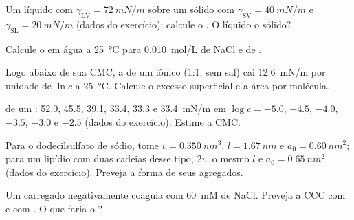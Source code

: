 \begin{exercise}[$\star$]\label{exo:b3:colloids:3}
Um líquido com $\gamma_{\mathrm{LV}} = \qty{72}{mN/m}$ sobre um sólido com $\gamma_{\mathrm{SV}} = \qty{40}{mN/m}$ e $\gamma_{\mathrm{SL}} =
\qty{20}{mN/m}$ (dados do exercício): calcule o . O líquido  o sólido?
\end{exercise}

\begin{exercise}[$\star$]\label{exo:b3:colloids:4}
Calcule o  em água a \qty{25}{\celsius} para \qty{0.010}{mol/L} de NaCl e de
.
\end{exercise}

\begin{exercise}[$\star\star$]\label{exo:b3:colloids:5}
Logo abaixo de sua CMC, a  de um  iônico (1:1, sem sal)
cai \qty{12.6}{mN/m} por unidade de $\ln c$ a \qty{25}{\celsius}. Calcule o excesso superficial e
a área por molécula.
\end{exercise}

\begin{exercise}[$\star\star$]\label{exo:b3:colloids:6}
 de um : 52.0, 45.5, 39.1, 33.4, 33.3 e
\qty{33.4}{mN/m} em $\log c = -5.0$, $-4.5$, $-4.0$, $-3.5$, $-3.0$ e $-2.5$ (dados do exercício).
Estime a CMC.
\end{exercise}

\begin{exercise}[$\star\star$]\label{exo:b3:colloids:7}
Para o dodecilsulfato de sódio, tome $v = \qty{0.350}{nm^3}$, $l = \qty{1.67}{nm}$ e $a_0 = \qty{0.60}{nm^2}$; para um
lipídio com duas cadeias desse tipo, $2v$, o mesmo $l$ e $a_0 = \qty{0.65}{nm^2}$ (dados do
exercício). Preveja a forma de seus agregados.
\end{exercise}

\begin{exercise}[$\star\star$]\label{exo:b3:colloids:8}
Um  carregado negativamente coagula com \qty{60}{mM} de NaCl. Preveja a CCC com 
e com . O que faria o ?
\end{exercise}

